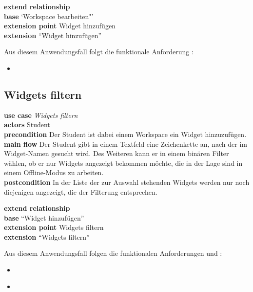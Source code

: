 \textbf{extend relationship}\\
\textbf{base} `Workspace bearbeiten"'\\
\textbf{extension point} Widget hinzufügen\\
\textbf{extension} "`Widget hinzufügen"'

Aus diesem Anwendungsfall folgt die funktionale Anforderung :
\begin{itemize}
 \item \requirement{\requirementWidgetAdd}\label{requirementWidgetAdd}
\end{itemize}

\subsection{Widgets filtern}
\textbf{use case} \emph{Widgets filtern}\\
\textbf{actors} Student\\
\textbf{precondition} Der Student ist dabei einem Workspace ein Widget hinzuzufügen.\\
\textbf{main flow} Der Student gibt in einem Textfeld eine Zeichenkette an, nach der im Widget-Namen gesucht wird. Des Weiteren kann er in einem binären Filter wählen, ob er nur Widgets angezeigt bekommen möchte, die in der Lage sind in einem Offline-Modus zu arbeiten.\\
\textbf{postcondition} In der Liste der zur Auswahl stehenden Widgets werden nur noch diejenigen angezeigt, die der Filterung entsprechen.
 
\textbf{extend relationship}\\
\textbf{base} "`Widget hinzufügen"'\\
\textbf{extension point} Widgets filtern\\
\textbf{extension} "`Widgets filtern"'
 
Aus diesem Anwendungsfall folgen die funktionalen Anforderungen  und :
\begin{itemize}
 \item \requirement{\requirementWidgetFilterName}\label{requirementWidgetFilterName}
 \item \requirement{\requirementWidgetFilterOnline}\label{requirementWidgetFilterOnline}
\end{itemize}
 
